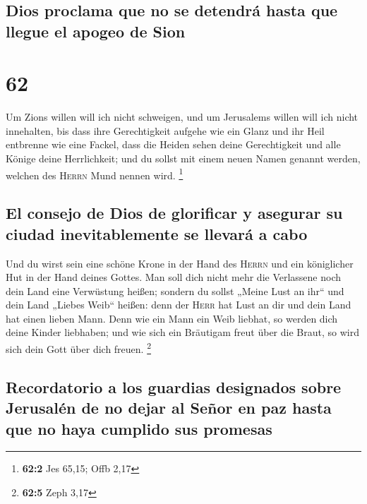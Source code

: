 \hypertarget{dios-proclama-que-no-se-detendruxe1-hasta-que-llegue-el-apogeo-de-sion}{%
\subsection{Dios proclama que no se detendrá hasta que llegue el apogeo
de
Sion}\label{dios-proclama-que-no-se-detendruxe1-hasta-que-llegue-el-apogeo-de-sion}}

\hypertarget{section-61}{%
\section{62}\label{section-61}}

 Um Zions willen will ich nicht schweigen, und um
Jerusalems willen will ich nicht innehalten, bis dass ihre Gerechtigkeit
aufgehe wie ein Glanz und ihr Heil entbrenne wie eine Fackel,
 dass die Heiden sehen deine Gerechtigkeit und alle Könige
deine Herrlichkeit; und du sollst mit einem neuen Namen genannt werden,
welchen des \textsc{Herrn} Mund nennen wird. \footnote{\textbf{62:2} Jes
  65,15; Offb 2,17}

\hypertarget{el-consejo-de-dios-de-glorificar-y-asegurar-su-ciudad-inevitablemente-se-llevaruxe1-a-cabo}{%
\subsection{El consejo de Dios de glorificar y asegurar su ciudad
inevitablemente se llevará a
cabo}\label{el-consejo-de-dios-de-glorificar-y-asegurar-su-ciudad-inevitablemente-se-llevaruxe1-a-cabo}}

 Und du wirst sein eine schöne Krone in der Hand des
\textsc{Herrn} und ein königlicher Hut in der Hand deines Gottes.
 Man soll dich nicht mehr die Verlassene noch dein Land
eine Verwüstung heißen; sondern du sollst „Meine Lust an ihr`` und dein
Land „Liebes Weib`` heißen: denn der \textsc{Herr} hat Lust an dir und
dein Land hat einen lieben Mann.  Denn wie ein Mann ein
Weib liebhat, so werden dich deine Kinder liebhaben; und wie sich ein
Bräutigam freut über die Braut, so wird sich dein Gott über dich freuen.
\footnote{\textbf{62:5} Zeph 3,17}

\hypertarget{recordatorio-a-los-guardias-designados-sobre-jerusaluxe9n-de-no-dejar-al-seuxf1or-en-paz-hasta-que-no-haya-cumplido-sus-promesas}{%
\subsection{Recordatorio a los guardias designados sobre Jerusalén de no
dejar al Señor en paz hasta que no haya cumplido sus
promesas}\label{recordatorio-a-los-guardias-designados-sobre-jerusaluxe9n-de-no-dejar-al-seuxf1or-en-paz-hasta-que-no-haya-cumplido-sus-promesas}}


